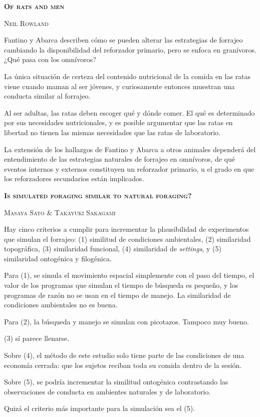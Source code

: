 \documentclass[a4paper,12pt]{article}
\begin{document}
{\scshape\bfseries Of rats and men}

{\scshape Neil Rowland}

Fantino y Abarca describen cómo se pueden alterar las estrategias de forrajeo cambiando la disponibilidad del reforzador primario, pero se enfoca en granívoros. ¿Qué pasa con los omnívoros?

La única situación de certeza del contenido nutricional de la comida en las ratas viene cuando maman al ser jóvenes, y curiosamente entonces muestran una conducta similar al forrajeo.

Al ser adultas, las ratas deben escoger qué y dónde comer. El qué es determinado por sus necesidades nutricionales, y es posible argumentar que las ratas en libertad no tienen las mismas necesidades que las ratas de laboratorio. 

La extensión de los hallazgos de Fantino y Abarca a otros animales dependerá del entendimiento de las estrategias naturales de forrajeo en omnívoros, de qué eventos internos y externos constituyen un reforzador primario, u el grado en que los reforzadores secundarios están implicados.

{\scshape\bfseries Is simulated foraging similar to natural foraging?}

{\scshape Masaya Sato \& Takayuki Sakagami}

Hay cinco criterios a cumplir para incrementar la plausibilidad de experimentos que simulan el forrajeo: (1) similitud de condiciones ambientales, (2) similaridad topográfica, (3) similaridad funcional, (4) similaridad de {\itshape settings}, y (5) similaridad ontogénica y filogénica.

Para (1), se simula el movimiento espacial simplemente con el paso del tiempo, el valor de los programas que simulan el tiempo de búsqueda es pequeño, y los programas de razón no se usan en el tiempo de manejo. La similaridad de condiciones ambientales no es buena.

Para (2), la búsqueda y manejo se simulan con picotazos. Tampoco muy bueno.

(3) sí parece llenarse.

Sobre (4), el método de este estudio solo tiene parte de las condiciones de una economía cerrada: que los sujetos reciban toda su comida dentro de la sesión.

Sobre (5), se podría incrementar la similitud ontogénica contrastando las observaciones de conducta en ambientes naturales y de laboratorio.

Quizá el criterio más importante para la simulación sea el (5). 
\end{document}
